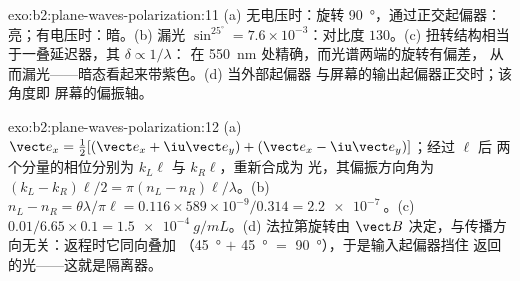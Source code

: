 \begin{solution}{exo:b2:plane-waves-polarization:11}
(a) 无电压时：旋转 \qty{90}{\degree}，通过正交起偏器：
亮；有电压时：暗。(b) 漏光 $\sin^25^\circ = 7.6 \times 10^{-3}$：对比度
$130$。(c) 扭转结构相当于一叠延迟器，其 $\delta \propto 1/\lambda$：
在 \qty{550}{nm} 处精确，而光谱两端的旋转有偏差，
从而漏光——暗态看起来带紫色。(d) 当外部起偏器
与屏幕的输出起偏器正交时；该角度即
屏幕的偏振轴。
\end{solution}

\begin{solution}{exo:b2:plane-waves-polarization:12}
(a) $\vect e_x = \tfrac12[(\vect e_x + \iu\vect e_y) + (\vect e_x - \iu\vect e_y)]$；经过 $\ell$ 后
两个分量的相位分别为 $k_L\ell$ 与 $k_R\ell$，重新合成为
光，其偏振方向角为 $(k_L - k_R)\ell/2 = \pi(n_L - n_R)\ell/\lambda$。(b) $n_L -
n_R = \theta\lambda/\pi\ell = 0.116 \times 589 \times 10^{-9}/0.314 = \qty{2.2e-7}{}$。(c)
$0.01/6.65 \times 0.1 = \qty{1.5e-4}{g/mL}$。(d) 法拉第旋转由
$\vect B$ 决定，与传播方向无关：返程时它同向叠加
（\qty{45}{\degree} $+$ \qty{45}{\degree} $=$ \qty{90}{\degree}），于是输入起偏器挡住
返回的光——这就是隔离器。
\end{solution}

